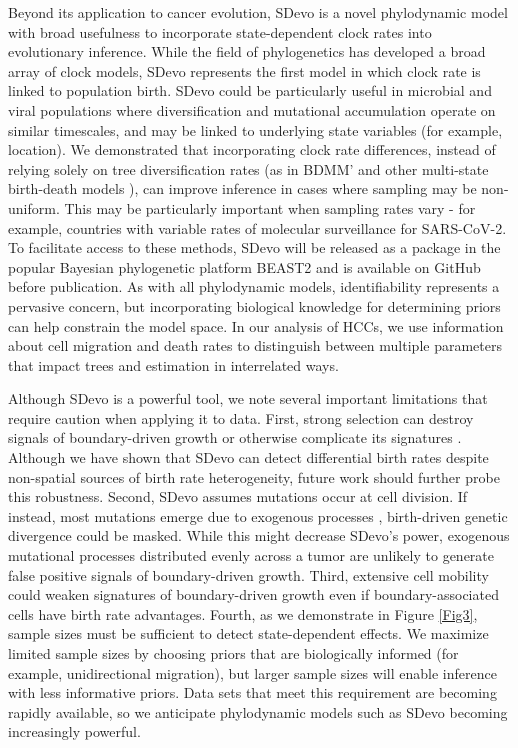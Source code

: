 \documentclass[12pt]{elife_based}
\begin{document}
Beyond its application to cancer evolution, SDevo is a novel phylodynamic model with broad usefulness to incorporate state-dependent clock rates into evolutionary inference. While the field of phylogenetics has developed a broad array of clock models, SDevo represents the first model in which clock rate is linked to population birth. SDevo could be particularly useful in microbial and viral populations where diversification and mutational accumulation operate on similar timescales, and may be linked to underlying state variables (for example, location). We demonstrated that incorporating clock rate differences, instead of relying solely on tree diversification rates (as in BDMM' and other multi-state birth-death models \citep{Maddison2007a,Kuhnert:2016vv,Vaughan2022}), can improve inference in cases where sampling may be non-uniform. This may be particularly important when sampling rates vary - for example, countries with variable rates of molecular surveillance for SARS-CoV-2. To facilitate access to these methods, SDevo will be released as a package in the popular Bayesian phylogenetic platform BEAST2 \citep{BouckaertBeast2} and is available on GitHub before publication. As with all phylodynamic models, identifiability represents a pervasive concern, but incorporating biological knowledge for determining priors can help constrain the model space. In our analysis of HCCs, we use information about cell migration and death rates to distinguish between multiple parameters that impact trees and estimation in interrelated ways.   

Although SDevo is a powerful tool, we note several important limitations that require caution when applying it to data. First, strong selection can destroy signals of boundary-driven growth or otherwise complicate its signatures \citep{Chkhaidze:2019uw, Li2022}. Although we have shown that SDevo can detect differential birth rates despite non-spatial sources of birth rate heterogeneity, future work should further probe this robustness. Second, SDevo assumes mutations occur at cell division. If instead, most mutations emerge due to exogenous processes \citep{abascal2021somatic}, birth-driven genetic divergence could be masked. While this might decrease SDevo's power, exogenous mutational processes distributed evenly across a tumor are unlikely to generate false positive signals of boundary-driven growth. Third, extensive cell mobility could weaken signatures of boundary-driven growth even if boundary-associated cells have birth rate advantages. Fourth, as we demonstrate in Figure \ref{Fig3}, sample sizes must be sufficient to detect state-dependent effects. We maximize limited sample sizes by choosing priors that are biologically informed (for example, unidirectional migration), but larger sample sizes will enable inference with less informative priors. Data sets that meet this requirement are becoming rapidly available, so we anticipate phylodynamic models such as SDevo becoming increasingly powerful. 
\end{document}
